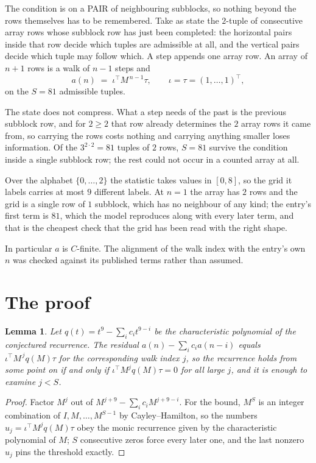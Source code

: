\documentclass[11pt,a4paper]{article}
\theoremstyle{plain}
\newtheorem{lemma}[theorem]{Lemma}
\theoremstyle{definition}
\begin{document}
The condition is on a PAIR of neighbouring subblocks, so nothing beyond the
rows themselves has to be remembered. Take as state the $2$-tuple of consecutive array rows
whose subblock row has just been completed: the horizontal pairs inside that row decide which
tuples are admissible at all, and the vertical pairs decide which tuple may follow which. A
step appends one array row. An array of $n+1$ rows is a walk of $n-1$ steps and
\[
a(n)\;=\;\iota^{\!\top}M^{\,n-1}\tau,\qquad\iota=\tau=(1,\dots,1)^{\!\top},
\]
on the $S=81$ admissible tuples.

The state does not compress. What a step needs of the past is the previous subblock row, and
for $2\ge2$ that row already determines the $2$ array rows it came from, so carrying the
rows costs nothing and carrying anything smaller loses information. Of the $3^{2\cdot
2}=81$ tuples of $2$ rows, $S=81$ survive the condition inside a single subblock row;
the rest could not occur in a counted array at all.

Over the alphabet $\{0,\dots,2\}$ the statistic takes values in $[0,8]$, so the
grid it labels carries at most $9$ different labels. At $n=1$ the array has $2$
rows and the grid is a single row of $1$
subblock, which has no neighbour of any kind; the entry's first term is
$81$, which the model reproduces along with every later term, and that is the cheapest
check that the grid has been read with the right shape.

In particular $a$ is $C$-finite. The alignment of the walk index with the entry's own $n$ was
checked against its published terms rather than assumed.

\section{The proof}

\begin{lemma}\label{lem:crit}
Let $q(t)=t^{9}-\sum_i c_it^{9-i}$ be the characteristic polynomial of the
conjectured recurrence. The residual $a(n)-\sum_ic_ia(n-i)$ equals
$\iota^{\!\top}M^{\,j}q(M)\tau$ for the corresponding walk index $j$, so the recurrence
holds from some point on if and only if $\iota^{\!\top}M^{j}q(M)\tau=0$ for all large $j$,
and it is enough to examine $j<S$.
\end{lemma}

\begin{proof}
Factor $M^{j}$ out of $M^{j+9}-\sum_ic_iM^{j+9-i}$. For the bound, $M^{S}$
is an integer combination of $I,M,\dots,M^{S-1}$ by Cayley--Hamilton, so the numbers
$u_j=\iota^{\!\top}M^{j}q(M)\tau$ obey the monic recurrence given by the characteristic
polynomial of $M$; $S$ consecutive zeros force every later one, and the last nonzero $u_j$
pins the threshold exactly.
\end{proof}
\end{document}
